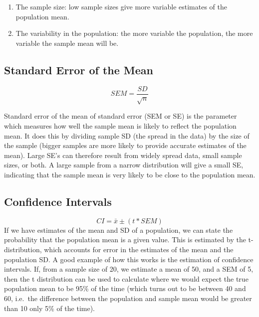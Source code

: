 \documentclass[
]{book}
\begin{document}
\begin{enumerate}
\def\labelenumi{\arabic{enumi})}
\item
  The sample size: low sample sizes give more variable estimates of the population mean.
\item
  The variability in the population: the more variable the population, the
  more variable the sample mean will be.
\end{enumerate}

\hypertarget{standard-error-of-the-mean}{%
\subsection*{Standard Error of the Mean}\label{standard-error-of-the-mean}}

\[
SEM = \frac{SD}{\sqrt{n}}
\]

Standard error of the mean of standard error (SEM or SE) is the parameter which measures how well the sample mean is likely to reflect the population mean. It does this by dividing sample SD (the spread in the data) by the size of the sample (bigger samples are more likely to provide accurate estimates of the mean). Large SE's can therefore result from widely spread data, small sample sizes, or both. A large sample from a narrow distribution will give a small SE, indicating that the sample mean is very likely to be close to the population mean.

\hypertarget{confidence-intervals}{%
\subsection*{Confidence Intervals}\label{confidence-intervals}}

\[
CI =\bar{x} ± (t * SEM)
\]
If we have estimates of the mean and SD of a population, we can state the probability that the population mean is a given value. This is estimated by the t-distribution, which accounts for error in the estimates of the mean and the population SD. A good example of how this works is the estimation of confidence intervals. If, from a sample size of 20, we estimate a mean of 50, and a SEM of 5, then the t distribution can be used to calculate where we would expect the true population mean to be 95\% of the time (which turns out to be between 40 and 60, i.e.~the difference between the population and sample mean would be greater than 10 only 5\% of the time).
\end{document}
